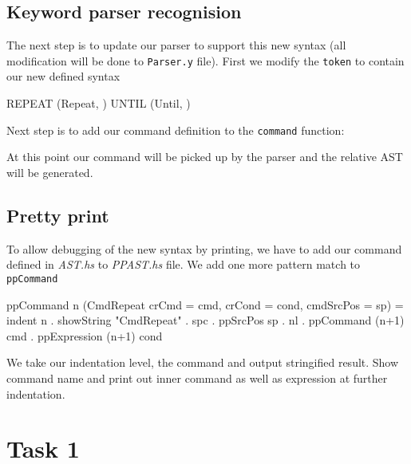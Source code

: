 \documentclass{article}
\begin{document}
\subsection{Keyword parser recognision}
\begin{flushleft}
The next step is to update our parser to support this new syntax (all modification will be done to \texttt{Parser.y} file). First we modify the \texttt{token} to contain our new defined syntax
\end{flushleft}
\begin{code}
REPEAT      { (Repeat, $$) }
UNTIL       { (Until, $$) }
\end{code}
\begin{flushleft}
Next step is to add our command definition to the \texttt{command} function:
\end{flushleft}
\begin{flushleft}
At this point our command will be picked up by the parser and the relative AST will be generated.
\end{flushleft}

\subsection{Pretty print}
\begin{flushleft}
To allow debugging of the new syntax by printing, we have to add our command defined in \textit{AST.hs} to \textit{PPAST.hs} file. We add one more pattern match to \texttt{ppCommand}
\end{flushleft}
\begin{code}
ppCommand n (CmdRepeat {crCmd = cmd, crCond = cond, cmdSrcPos = sp}) =
    indent n . showString "CmdRepeat" . spc . ppSrcPos sp . nl
    . ppCommand (n+1) cmd 
    . ppExpression (n+1) cond
\end{code}
\begin{flushleft}
We take our indentation level, the command and output stringified result. Show command name and print out inner command as well as expression at further indentation.
\end{flushleft}

\section{Task 1}
\end{document}
